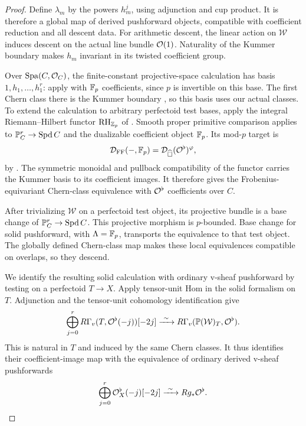 \begin{proof}
Define $\lambda_m$ by the powers $h_m^j$, using adjunction and cup
product.  It is therefore a global map of derived pushforward objects,
compatible with coefficient reduction and all descent data.
For arithmetic descent, the linear action on $\mathcal W$ induces
descent on the actual line bundle $\mathcal O(1)$.  Naturality of the Kummer
boundary makes $h_m$ invariant in its twisted coefficient group.

Over $\operatorname{Spa}(C,\mathcal O_C)$, the finite-constant
projective-space calculation has basis
$1,h_1,\ldots,h_1^r$: apply
\cite[Construction~3.2.1 and Proposition~3.2.2]{LRZ2024}
with $\mathbb F_p$ coefficients, since $p$ is invertible on this base.
The first Chern class there is the Kummer boundary
\cite[Variant~3.1.8]{LRZ2024}, so this basis uses our actual classes.
To extend the calculation to arbitrary perfectoid test bases, apply
the integral Riemann--Hilbert functor
$\operatorname{RH}_{\mathbb Z_p}$ of \cite[Theorem~5.1.7]{ALM2026}.
Smooth proper primitive comparison
\cite[Proposition~5.2.2 and Example~5.2.3]{ALM2026} applies to
$\mathbb P_C^r\to\operatorname{Spd} C$ and the dualizable coefficient object
$\mathbb F_p$. Its mod-$p$ target is
\[
 \mathcal D_{\mathrm{FF}}(-,\mathbb F_p)
   =\mathcal D_{\widehat{\square}}(\mathcal O^\flat)^{\varphi},
\]
by \cite[Remark~5.1.9 and the beginning of \S5.2]{ALM2026}.
The symmetric monoidal and pullback compatibility of the functor
carries the Kummer basis to its coefficient images. It therefore
gives the Frobenius-equivariant Chern-class equivalence with
$\mathcal O^\flat$ coefficients over $C$.

After trivializing $\mathcal W$ on a perfectoid test object, its
projective bundle is a base change of $\mathbb P_C^r\to\operatorname{Spd} C$.
This projective morphism is $p$-bounded. Base change for solid
pushforward, \cite[Proposition~4.2.7(ii)]{ALM2026} with
$\Lambda=\mathbb F_p$, transports the equivalence to that test object.
The globally defined Chern-class map makes these local equivalences
compatible on overlaps, so they descend.

We identify the resulting solid calculation with ordinary v-sheaf
pushforward by testing on a perfectoid $T\to X$. Apply tensor-unit
Hom in the solid formalism on $T$. Adjunction and the tensor-unit
cohomology identification
\cite[Theorem~3.2.1(iii)--(iv)]{BMR2026} give
\[
 \bigoplus_{j=0}^r
    R\Gamma_v(T,\mathcal O^\flat(-j))[-2j]
 \xrightarrow{\ \sim\ }
    R\Gamma_v(\mathbb P(\mathcal W)_T,\mathcal O^\flat).
\]
This is natural in $T$ and induced by the same Chern classes.
It thus identifies their coefficient-image map with the equivalence
of ordinary derived v-sheaf pushforwards
\[
 \bigoplus_{j=0}^r\mathcal O^\flat_X(-j)[-2j]
       \xrightarrow{\ \sim\ } Rg_*\mathcal O^\flat.
\]


\end{proof}
